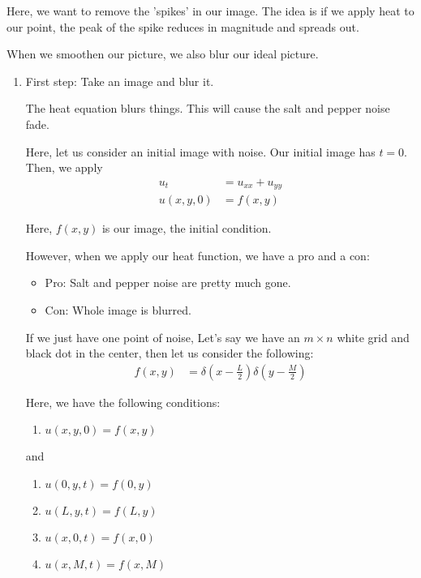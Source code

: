 Here, we want to remove the 'spikes' in our image. The idea is if we apply heat to our point, the peak of the spike reduces in magnitude and spreads out.

When we smoothen our picture, we also blur our ideal picture.

\begin{enumerate}
  \item First step: Take an image and blur it.

  The heat equation blurs things. This will cause the salt and pepper noise fade.

  Here, let us consider an initial image with noise. Our initial image has $t = 0$. Then, we apply
  \begin{align}
    u_t & = u_{xx} + u_{yy}\\
    u(x, y, 0) & = f(x, y)
  \end{align}

  Here, $f(x, y)$ is our image, the initial condition.

  However, when we apply our heat function, we have a pro and a con:
  \begin{itemize}
    \item Pro: Salt and pepper noise are pretty much gone.
    \item Con: Whole image is blurred.
  \end{itemize}

  If we just have one point of noise, Let's say we have an $m \times n$ white grid and black dot in the center,
  then let us consider the following:
  \begin{align}
    f(x, y) & = \delta\left(x - \frac{L}{2}\right) \delta\left(y - \frac{M}{2}\right)
  \end{align}

  Here, we have the following conditions:
  \begin{enumerate}
    \item $u(x, y, 0) = f(x, y)$
  \end{enumerate}

  and
  \begin{enumerate}
    \item $u(0, y, t) = f(0, y)$
    \item $u(L, y, t) = f(L, y)$
    \item $u(x, 0, t) = f(x, 0)$
    \item $u(x, M, t) = f(x, M)$
  \end{enumerate}
\end{enumerate}

